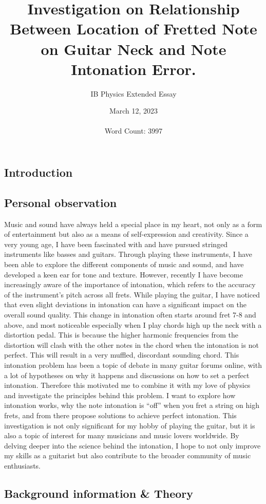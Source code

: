 \documentclass[11pt]{article}
\title{Investigation on Relationship Between Location of Fretted Note on Guitar Neck and Note Intonation Error.}
\author{IB Physics Extended Essay}
\date{March 12, 2023 \\~\\\tiny Word Count: 3997}
\begin{document}
    \maketitle
    \newpage
    \tableofcontents
    \newpage
    \begin{flushleft}
    \section{Introduction}
        \subsection{Personal observation}
            Music and sound have always held a special place in my heart, not only as a form of entertainment but also as a means of self-expression and creativity. Since a very young age, I have been fascinated with and have pursued stringed instruments like basses and guitars. Through playing these instruments, I have been able to explore the different components of music and sound, and have developed a keen ear for tone and texture. However, recently I have become increasingly aware of the importance of intonation, which refers to the accuracy of the instrument's pitch across all frets. While playing the guitar, I have noticed that even slight deviations in intonation can have a significant impact on the overall sound quality. This change in intonation often starts around fret 7-8 and above, and most noticeable especially when I play chords high up the neck with a distortion pedal. This is because the higher harmonic frequencies from the distortion will clash with the other notes in the chord when the intonation is not perfect. This will result in a very muffled, discordant sounding chord. This intonation problem has been a topic of debate in many guitar forums online, with a lot of hypotheses on why it happens and discussions on how to set a perfect intonation. Therefore this motivated me to combine it with my love of physics and investigate the principles behind this problem. I want to explore how intonation works, why the note intonation is “off” when you fret a string on high frets, and from there propose solutions to achieve perfect intonation. This investigation is not only significant for my hobby of playing the guitar, but it is also a topic of interest for many musicians and music lovers worldwide. By delving deeper into the science behind the intonation, I hope to not only improve my skills as a guitarist but also contribute to the broader community of music enthusiasts.
        \subsection{Background information \& Theory}

\end{flushleft}
\end{document}
